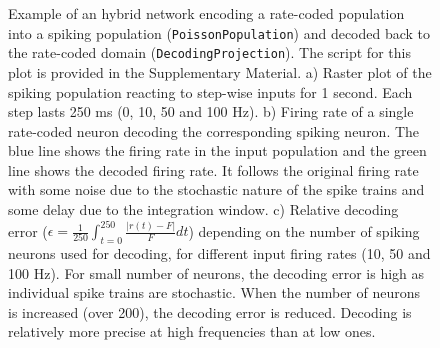 \documentclass[
  11pt,
  a4paper,
]{scrbook}
\begin{document}
\begin{figure}


\caption{\label{fig-fini:hybrid}Example of an hybrid network encoding a
rate-coded population into a spiking population
(\texttt{PoissonPopulation}) and decoded back to the rate-coded domain
(\texttt{DecodingProjection}). The script for this plot is provided in
the Supplementary Material. a) Raster plot of the spiking population
reacting to step-wise inputs for 1 second. Each step lasts 250 ms (0,
10, 50 and 100 Hz). b) Firing rate of a single rate-coded neuron
decoding the corresponding spiking neuron. The blue line shows the
firing rate in the input population and the green line shows the decoded
firing rate. It follows the original firing rate with some noise due to
the stochastic nature of the spike trains and some delay due to the
integration window. c) Relative decoding error
(\(\epsilon = \frac{1}{250} \int_{t=0}^{250} \frac{|r(t) - F|}{F} dt\))
depending on the number of spiking neurons used for decoding, for
different input firing rates (10, 50 and 100 Hz). For small number of
neurons, the decoding error is high as individual spike trains are
stochastic. When the number of neurons is increased (over 200), the
decoding error is reduced. Decoding is relatively more precise at high
frequencies than at low ones.}

\end{figure}%
\end{document}
